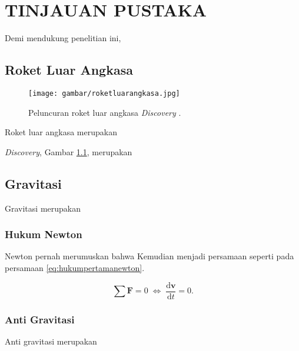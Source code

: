 \chapter{TINJAUAN PUSTAKA}
\label{chap:tinjauanpustaka}


Demi mendukung penelitian ini, \lipsum[1][1-5]

\section{Roket Luar Angkasa}
\label{sec:roketluarangkasa}

\begin{figure}[ht]
  \centering

  \texttt{[image: gambar/roketluarangkasa.jpg]}

  \caption{Peluncuran roket luar angkasa \emph{Discovery} \parencite{roketluarangkasa}.}
  \label{fig:roketluarangkasa}
\end{figure}

Roket luar angkasa merupakan \lipsum[1]

\emph{Discovery}, Gambar \ref{fig:roketluarangkasa}, merupakan \lipsum[2]

\section{Gravitasi}
\label{sec:gravitasi}

Gravitasi merupakan \lipsum[1]

\subsection{Hukum Newton}
\label{subsec:hukumnewton}

Newton \parencite{newton1687} pernah merumuskan bahwa \lipsum[1]
Kemudian menjadi persamaan seperti pada persamaan \ref{eq:hukumpertamanewton}.

\begin{equation}
  \label{eq:hukumpertamanewton}
  \sum \mathbf{F} = 0\; \Leftrightarrow\; \frac{\mathrm{d} \mathbf{v} }{\mathrm{d}t} = 0.
\end{equation}

\subsection{Anti Gravitasi}
\label{subsec:antigravitasi}

Anti gravitasi merupakan \lipsum[1]
